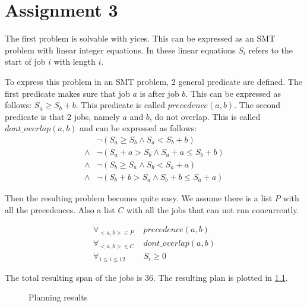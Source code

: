 \chapter{Assignment 3}
The first problem is solvable with yices. This can be expressed as an SMT problem with linear integer equations.  In these linear equations $S_i$ refers to the start of job $i$ with length $i$.

To express this problem in an SMT problem, 2 general predicate are defined. The first predicate makes sure that job $a$ is after job $b$. This can be expressed as follows: $S_{a} \ge S_{b} + b$. This predicate is called $precedence(a, b)$. The second predicate is that 2 jobs, namely $a$ and $b$, do not overlap. This is called $dont\_overlap(a, b)$ and can be expressed as follows:
\begin{align*}
&\neg (S_a \ge S_b \land S_a < S_b + b) \\
\land &\neg (S_a + a > S_b \land S_a + a \le S_b + b) \\
\land &\neg (S_b \ge S_a \land S_b < S_a + a) \\
\land &\neg (S_b + b > S_a \land S_b + b \le S_a + a) 
\end{align*}

Then the resulting problem becomes quite easy. We assume there is a list $P$ with all the precedences. Also a list $C$ with all the jobs that can not run concurrently.

\begin{align*}
\forall_{<a,b> \in P}& \; precedence(a, b) \\
\forall_{<a,b> \in C}& \; dont\_overlap(a, b) \\
\forall_{1 \le i \le 12}& \; S_i \ge 0
\end{align*}

The total resulting span of the jobs is 36. The resulting plan is plotted in \ref{fig:assignments3}.

\begin{figure}
	\centering
	\caption{Planning results}
	\label{fig:assignments3}
\end{figure}
